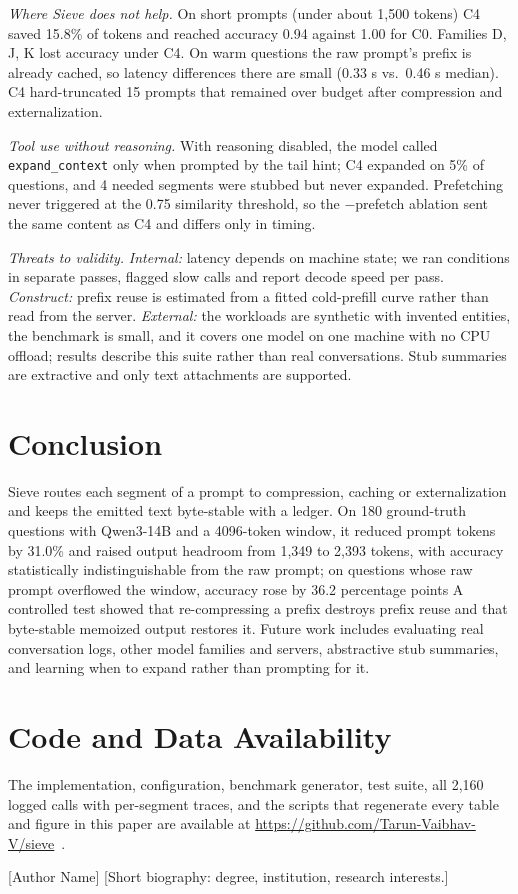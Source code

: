 \documentclass[journal]{IEEEtran}
\begin{document}
\textit{Where Sieve does not help.} On short prompts (under about 1,500 tokens) C4 saved 15.8\% of tokens and reached accuracy 0.94 against 1.00 for C0. Families D, J, K lost accuracy under C4. On warm questions the raw prompt's prefix is already cached, so latency differences there are small (0.33 s vs.\ 0.46 s median). C4 hard-truncated 15 prompts that remained over budget after compression and externalization.

\textit{Tool use without reasoning.} With reasoning disabled, the model called \texttt{expand\_context} only when prompted by the
tail hint; C4 expanded on 5\% of questions, and 4 needed segments were stubbed but never expanded. Prefetching never triggered at the 0.75 similarity threshold, so the $-$prefetch ablation sent the same content as C4 and differs only in timing.

\textit{Threats to validity.} \emph{Internal:} latency depends on machine state; we ran conditions in separate passes, flagged slow
calls and report decode speed per pass. \emph{Construct:} prefix reuse is estimated from a fitted cold-prefill curve rather than read
from the server. \emph{External:} the workloads are synthetic with invented entities, the benchmark is small, and it covers one model
on one machine with no CPU offload; results describe this suite rather than real conversations. Stub summaries are extractive and
only text attachments are supported.

\section{Conclusion}\label{sec:conclusion}
Sieve routes each segment of a prompt to compression, caching or externalization and keeps the emitted text byte-stable with a
ledger. On 180 ground-truth questions with Qwen3-14B and a 4096-token window, it reduced prompt tokens by 31.0\%
and raised output headroom from 1,349 to 2,393 tokens, with accuracy statistically indistinguishable from the raw prompt; on questions whose raw prompt overflowed the window, accuracy rose by 36.2 percentage points A controlled test showed that re-compressing a
prefix destroys prefix reuse and that byte-stable memoized output restores it. Future work includes evaluating real conversation
logs, other model families and servers, abstractive stub summaries, and learning when to expand rather than prompting for it.

\section*{Code and Data Availability}
The implementation, configuration, benchmark generator, test suite, all 2,160 logged calls with per-segment traces, and the
scripts that regenerate every table and figure in this paper are available at \url{https://github.com/Tarun-Vaibhav-V/sieve}~\cite{sieve2026code}.




\begin{IEEEbiographynophoto}{[Author Name]}
[Short biography: degree, institution, research interests.]
\end{IEEEbiographynophoto}
\end{document}
